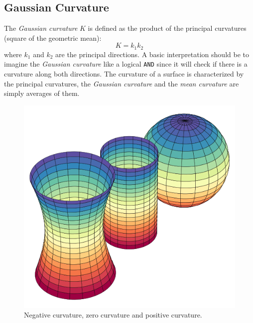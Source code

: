 \subsection{Gaussian Curvature}
The \textit{Gaussian curvature} $K$ is defined as the product of the principal curvatures (square of the geometric mean):
$$K=k_1k_2$$
where $k_1$ and $k_2$ are the principal directions. A basic interpretation should be to imagine the \textit{Gaussian curvature} like a logical \texttt{AND} since it will check if there is a curvature along both directions.
The curvature of a surface is characterized by the principal curvatures, the \textit{Gaussian curvature} and the \textit{mean curvature} are simply averages of them.
\begin{figure}[h]
  \centering
\includegraphics[scale=0.5]{images/gaussian_curvature_examples.png}
\caption{Negative curvature, zero curvature and positive curvature.}\label{fig:curvature-gaussian}
\end{figure}
